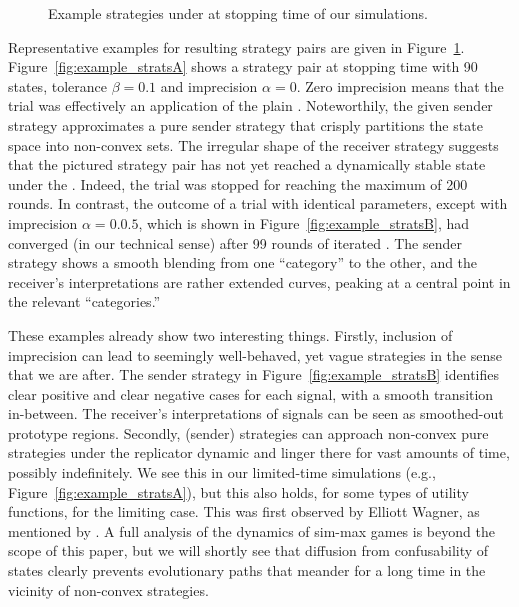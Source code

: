 \documentclass[fleqn,reqno,10pt]{article}
\newcommand{\rd}{\acro{rd}} %
\newcommand{\rdd}{\acro{rdd}} %
\newcommand{\imprecision}{\ensuremath{\alpha}} %
\newcommand{\toler}{\ensuremath{\beta}} %
\newcommand{\ns}{\ensuremath{n_s}} %
\begin{document}
\begin{figure}


  \caption{Example strategies under \rdd at stopping time of our simulations.}
  \label{fig:example_strats}
\end{figure}

Representative examples for resulting strategy pairs are given in
Figure~\ref{fig:example_strats}. Figure~\ref{fig:example_stratsA} shows a strategy pair at
stopping time with 90 states, tolerance $\toler = 0.1$ and imprecision $\imprecision = 0$. Zero
imprecision means that the trial was effectively an application of the plain \rd. Noteworthily,
the given sender strategy approximates a pure sender strategy that crisply partitions the state
space into non-convex sets. The irregular shape of the receiver strategy suggests that the
pictured strategy pair has not yet reached a dynamically stable state under the \rd. Indeed,
the trial was stopped for reaching the maximum of 200 rounds. In contrast, the outcome of a
trial with identical parameters, except with imprecision $\imprecision = 0.0.5$, which is shown
in Figure~\ref{fig:example_stratsB}, had converged (in our technical sense) after 99 rounds of
iterated \rdd. The sender strategy shows a smooth blending from one ``category'' to the other,
and the receiver's interpretations are rather extended curves, peaking at a central point in
the relevant ``categories.''

These examples already show two interesting things. Firstly, inclusion of imprecision can lead
to seemingly well-behaved, yet vague strategies in the sense that we are after. The sender
strategy in Figure~\ref{fig:example_stratsB} identifies clear positive and clear negative cases
for each signal, with a smooth transition in-between. The receiver's interpretations of signals
can be seen as smoothed-out prototype regions. Secondly, (sender) strategies can approach
non-convex pure strategies under the replicator dynamic and linger there for vast amounts of
time, possibly indefinitely. We see this in our limited-time simulations (e.g.,
Figure~\ref{fig:example_stratsA}), but this also holds, for some types of utility functions,
for the limiting case. This was first observed by Elliott Wagner, as mentioned by
\citet{OConnor2014-OCOEPC}.  A full analysis of the dynamics of sim-max games is beyond the
scope of this paper, but we will shortly see that diffusion from confusability of states
clearly prevents evolutionary paths that meander for a long time in the vicinity of non-convex
strategies.
\end{document}
